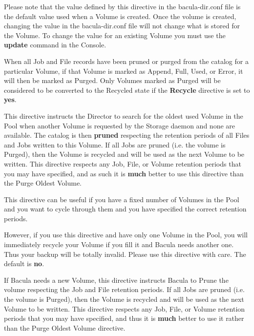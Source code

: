 \begin{description}
   Please note that the value defined by this directive in the
   bacula-dir.conf file is the default value used when a Volume is created.
   Once the volume is created, changing the value in the bacula-dir.conf
   file will not change what is stored for the Volume.  To change the value
   for an existing Volume you must use the {\bf update} command in the
   Console.

   When all Job and File records have been pruned or purged from the      
   catalog for a particular Volume, if that Volume is marked as
   Append, Full, Used, or Error, it will then be marked as Purged. Only
   Volumes marked as Purged will be considered to be converted to the
   Recycled state if the {\bf Recycle} directive is set to {\bf yes}.


\label{RecycleOldest}
\item [Recycle Oldest Volume = \lt{}yes\vb{}no\gt{}]
   This directive instructs the Director to search for the oldest used
   Volume in the Pool when another Volume is requested by the Storage
   daemon and none are available.  The catalog is then {\bf pruned}
   respecting the retention periods of all Files and Jobs written to this
   Volume.  If all Jobs are pruned (i.e. the volume is Purged), then the
   Volume is recycled and will be used as the next Volume to be written.
   This directive respects any Job, File, or Volume retention periods that
   you may have specified, and as such it is {\bf much} better to use this
   directive than the Purge Oldest Volume.

   This directive can be useful if you have a fixed number of Volumes in the
   Pool and you want to cycle through them and you have specified the correct
   retention periods.  

   However, if you use this directive and have only one
   Volume in the Pool, you will immediately recycle your Volume if you fill
   it and Bacula needs another one. Thus your backup will be totally invalid.
   Please use this directive with care. The default is {\bf no}.

\label{RecycleCurrent}

\item [Recycle Current Volume = \lt{}yes\vb{}no\gt{}]
   If Bacula needs a new Volume, this directive instructs Bacula to Prune
   the volume respecting the Job and File retention periods.  If all Jobs
   are pruned (i.e.  the volume is Purged), then the Volume is recycled and
   will be used as the next Volume to be written.  This directive respects
   any Job, File, or Volume retention periods that you may have specified,
   and thus it is {\bf much} better to use it rather than the Purge Oldest
   Volume directive.


\end{description}
